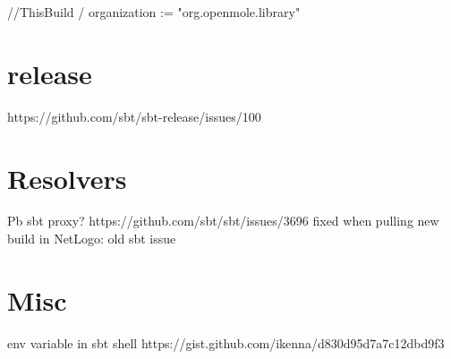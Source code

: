 //ThisBuild / organization := "org.openmole.library"


\section*{release}

https://github.com/sbt/sbt-release/issues/100

\section*{Resolvers}

Pb sbt proxy? https://github.com/sbt/sbt/issues/3696 fixed when pulling new build in NetLogo: old sbt issue


\section*{Misc}

env variable in sbt shell
https://gist.github.com/ikenna/d830d95d7a7c12dbd9f3


%
%



